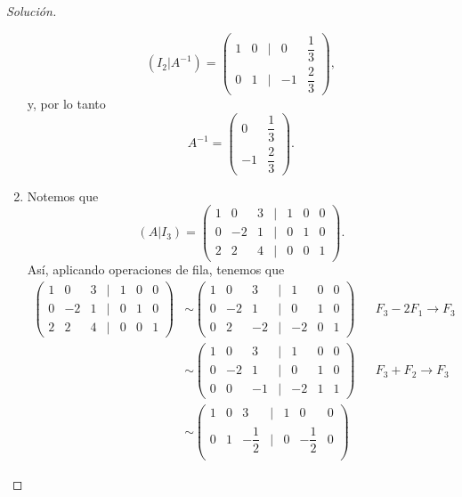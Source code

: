 \documentclass[a4,11pt]{aleph-notas}
\begin{document}
\begin{proof}[Solución]
\begin{enumerate}
        \[
            (I_2|A^{-1}) = \begin{pmatrix}
                1 & 0 & | & 0 & \dfrac{1}{3} \\[0.75em]
                0 & 1 & | & -1 & \dfrac{2}{3}
            \end{pmatrix},
        \]
        y, por lo tanto 
        \[
            A^{-1} = \begin{pmatrix}
                0 & \dfrac{1}{3} \\[0.75em]
                -1 & \dfrac{2}{3}
            \end{pmatrix}.
        \]
    \item Notemos que 
        \[
           (A|I_3) =  \begin{pmatrix}
                1 & 0 & 3 & | & 1 & 0 & 0 \\
                0 & -2 & 1 & | & 0 & 1 & 0 \\
                2 & 2 & 4 & | & 0 & 0 & 1 
            \end{pmatrix}.
        \]
        Así, aplicando operaciones de fila, tenemos que 
        \begin{align*}
            \begin{pmatrix}
                1 & 0 & 3 & | & 1 & 0 & 0 \\
                0 & -2 & 1 & | & 0 & 1 & 0 \\
                2 & 2 & 4 & | & 0 & 0 & 1 
            \end{pmatrix} & \sim \begin{pmatrix}
                1 & 0 & 3 & | & 1 & 0 & 0 \\
                0 & -2 & 1 & | & 0 & 1 & 0 \\
                0 & 2 & -2 & | & -2 & 0 & 1 
            \end{pmatrix} && F_3 - 2 F_1 \rightarrow F_3 \\
            & \sim \begin{pmatrix}
                1 & 0 & 3 & | & 1 & 0 & 0 \\
                0 & -2 & 1 & | & 0 & 1 & 0 \\
                0 & 0 & -1 & | & -2 & 1 & 1 
            \end{pmatrix} && F_3 + F_2 \rightarrow F_3 \\
            & \sim \begin{pmatrix}
                1 & 0 & 3 & | & 1 & 0 & 0 \\
                0 & 1 & -\dfrac{1}{2} & | & 0 & -\dfrac{1}{2} & 0 \\

\end{pmatrix}
\end{align*}
\end{enumerate}
\end{proof}
\end{document}
